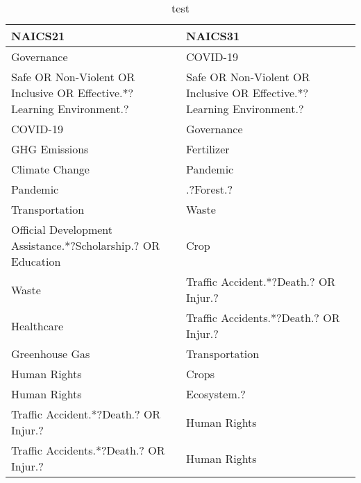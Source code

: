\begin{table}

\caption{\label{tab:}test}
\centering
\begin{tabular}[t]{ll}
\toprule
NAICS21 & NAICS31\\
\midrule
Governance & COVID-19\\
Safe OR Non-Violent OR Inclusive OR Effective.*?Learning Environment.? & Safe OR Non-Violent OR Inclusive OR Effective.*?Learning Environment.?\\
COVID-19 & Governance\\
GHG Emissions & Fertilizer\\
Climate Change & Pandemic\\
\addlinespace
Pandemic & .?Forest.?\\
Transportation & Waste\\
Official Development Assistance.*?Scholarship.? OR Education & Crop\\
Waste & Traffic Accident.*?Death.? OR Injur.?\\
Healthcare & Traffic Accidents.*?Death.? OR Injur.?\\
\addlinespace
Greenhouse Gas & Transportation\\
Human Rights & Crops\\
Human Rights & Ecosystem.?\\
Traffic Accident.*?Death.? OR Injur.? & Human Rights\\
Traffic Accidents.*?Death.? OR Injur.? & Human Rights\\
\bottomrule
\end{tabular}
\end{table}
